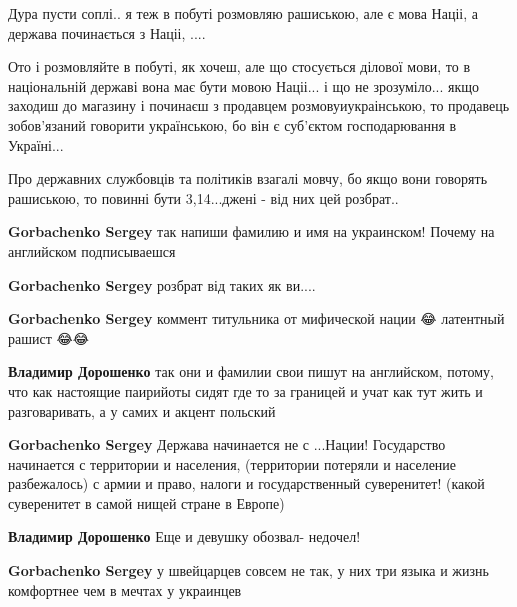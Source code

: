 \begin{itemize}
Дура пусти соплі.. я теж в побуті розмовляю рашиською, але є мова Націі, а
держава починається з Націі, ....

Ото і розмовляйте в побуті, як хочеш, але що стосується ділової мови, то в
національній державі вона має бути мовою Націі... і що не зрозуміло... якщо
заходиш до магазину і починаєш з продавцем розмовуиукраінською, то продавець
зобов'язаний говорити українською, бо він є суб'єктом господарювання в
Україні... 

Про державних службовців та політиків взагалі мовчу, бо якщо вони говорять
рашиською, то повинні бути 3,14...джені - від них цей розбрат..

\begin{itemize}
\textbf{Gorbachenko Sergey} так напиши фамилию и имя на украинском! Почему на английском подписываешся

\textbf{Gorbachenko Sergey} розбрат від таких як ви....

\textbf{Gorbachenko Sergey} коммент титульника от мифической нации 😂 латентный рашист 😂😂

\textbf{Владимир Дорошенко} так они и фамилии свои пишут на английском, потому,
что как настоящие паирийоты сидят где то за границей и учат как тут жить и
разговаривать, а у самих и акцент польский

\textbf{Gorbachenko Sergey} Держава начинается не с ...Нации! Государство начинается с территории и населения, (территории потеряли и население разбежалось) с армии и право, налоги и государственный суверенитет! (какой суверенитет в самой нищей стране в Европе)

\textbf{Владимир Дорошенко} Еще и девушку обозвал- недочел!

\textbf{Gorbachenko Sergey} у швейцарцев совсем не так, у них три языка и жизнь комфортнее чем в мечтах у украинцев
\end{itemize}



\end{itemize}
